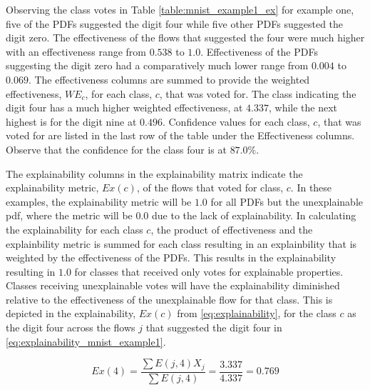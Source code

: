Observing the class votes in Table \ref{table:mnist_example1_ex} for example
one, five of the PDFs suggested the digit four while five other PDFs suggested
the digit zero.  The effectiveness of the flows that suggested the four were
much higher with an effectiveness range from $0.538$ to $1.0$.  Effectiveness of
the PDFs suggesting the digit zero had a comparatively much lower range from
$0.004$ to $0.069$.  The effectiveness columns are summed to provide the
weighted effectiveness, $WE_c$, for each class, $c$, that was voted for. The
class indicating the digit four has a much higher weighted effectiveness, at
$4.337$, while the next highest is for the digit nine at $0.496$. Confidence
values for each class, $c$, that was voted for are listed in the last row of the
table under the Effectiveness columns. Observe that the confidence for the class
four is at $87.0\%$.

The explainability columns in the explainability matrix indicate the
explainability metric, $Ex(c)$, of the flows that voted for class, $c$.
In these examples, the explainability metric will be $1.0$ for all PDFs but the
unexplainable pdf, where the metric will be $0.0$ due to the lack of
explainability.  In calculating the explainability for each class $c$, the
product of effectiveness and the explainbility metric is summed for each class
resulting in an explainbility that is weighted by the effectiveness of the PDFs.
This results in the explainability resulting in $1.0$ for classes that received
only votes for explainable properties.  Classes receiving unexplainable votes
will have the explainability diminished relative to the effectiveness of the
unexplainable flow for that class.  This is depicted in the explainability,
$Ex(c)$ from \eqref{eq:explainability}, for the class $c$ as the digit four
across the flows $j$ that suggested the digit four in
\eqref{eq:explainability_mnist_example1}.

\begin{equation}\label{eq:explainability_mnist_example1}
    Ex(4)=\frac{\sum{E(j,4)X_j}}{\sum{E(j,4)}} = \frac{3.337}{4.337}=0.769
\end{equation}

